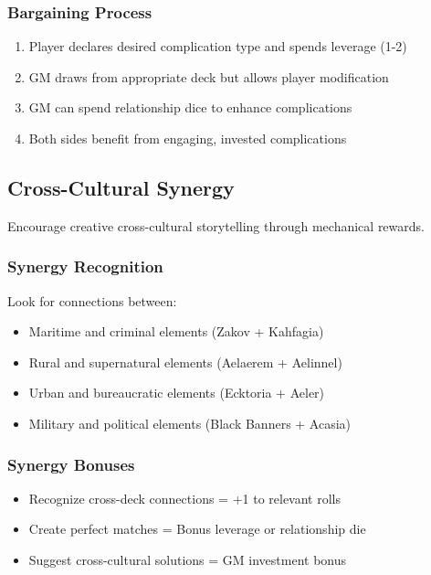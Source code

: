 \subsubsection{Bargaining Process}

\begin{enumerate}
\item Player declares desired complication type and spends leverage (1-2)
\item GM draws from appropriate deck but allows player modification
\item GM can spend relationship dice to enhance complications
\item Both sides benefit from engaging, invested complications
\end{enumerate}

\subsection{Cross-Cultural Synergy}

Encourage creative cross-cultural storytelling through mechanical rewards.

\subsubsection{Synergy Recognition}

Look for connections between:
\begin{itemize}
\item Maritime and criminal elements (Zakov + Kahfagia)
\item Rural and supernatural elements (Aelaerem + Aelinnel)
\item Urban and bureaucratic elements (Ecktoria + Aeler)
\item Military and political elements (Black Banners + Acasia)
\end{itemize}

\subsubsection{Synergy Bonuses}

\begin{itemize}
\item Recognize cross-deck connections = +1 to relevant rolls
\item Create perfect matches = Bonus leverage or relationship die
\item Suggest cross-cultural solutions = GM investment bonus
\end{itemize}

